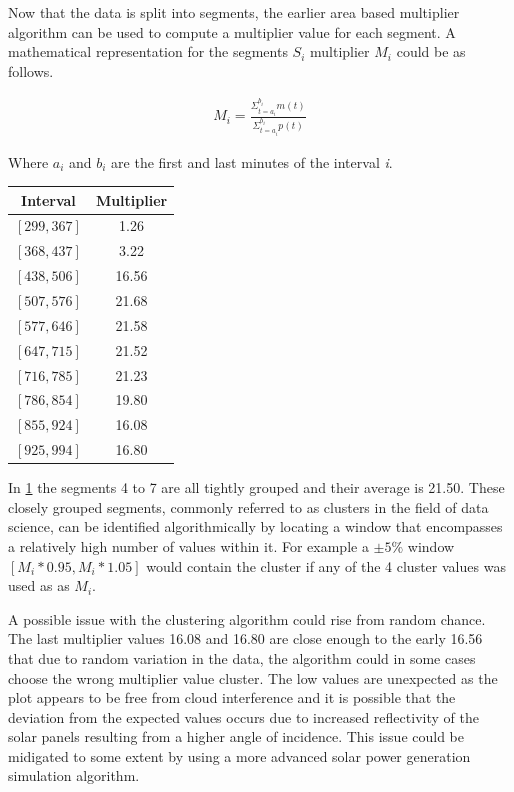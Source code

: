 \noindent Now that the data is split into segments, the earlier area based multiplier algorithm can be used to compute a multiplier value for each segment. A mathematical representation for the segments $S_i$ multiplier $M_i$ could be as follows. 

\begin{align}
	M_i =  \frac{\Sigma_{t=a_i}^{b_i} m(t)}{\Sigma_{t=a_i}^{b_i} p(t)}
\end{align}

\noindent Where $a_i$ and $b_i$ are the first and last minutes of the interval \textit{i}.



\begin{table}[!ht]
\centering
\begin{tabular}{c|c} \hline

Interval & Multiplier\\
\hline
$[299, 367]$ & 1.26 \\
$[368, 437]$ & 3.22 \\
$[438, 506]$ & 16.56 \\
$[507, 576]$ & 21.68 \\
$[577, 646]$ & 21.58 \\
$[647, 715]$ & 21.52 \\
$[716, 785]$ & 21.23 \\
$[786, 854]$ & 19.80 \\
$[855, 924]$ & 16.08 \\
$[925, 994]$ & 16.80 \\
\hline\hline
\end{tabular}
\label{table_segmentmatch1}
\end{table}

\vspace{10mm}

\noindent In \ref{table_segmentmatch1} the segments 4 to 7 are all tightly grouped and their average is 21.50. These closely grouped segments, commonly referred to as clusters in the field of data science, can be identified algorithmically by locating a window that encompasses a relatively high number of values within it. For example a $\pm 5\%$ window $[M_i*0.95, M_i*1.05]$ would contain the cluster if any of the 4 cluster values was used as as $M_i$.

A possible issue with the clustering algorithm could rise from random chance. The last multiplier values 16.08 and 16.80 are close enough to the early 16.56 that due to random variation in the data, the algorithm could in some cases choose the wrong multiplier value cluster. The low values are unexpected as the plot appears to be free from cloud interference and it is possible that the deviation from the expected values occurs due to increased reflectivity of the solar panels resulting from a higher angle of incidence. This issue could be midigated to some extent by using a more advanced solar power generation simulation algorithm.


